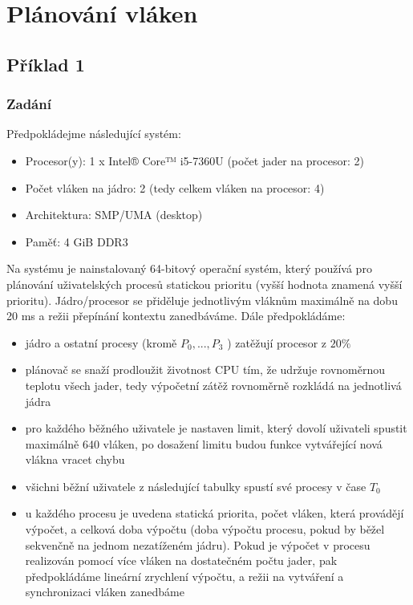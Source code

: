 \section{Plánování vláken}

\subsection{Příklad 1}
\subsubsection{Zadání}

Předpokládejme následující systém:
\begin{itemize}
    \item Procesor(y): 1 x Intel® Core™ i5-7360U (počet jader na procesor: 2)
    \item Počet vláken na jádro: 2 (tedy celkem vláken na procesor: 4)
    \item Architektura: SMP/UMA (desktop)
    \item Paměť: 4 GiB DDR3
\end{itemize}

Na systému je nainstalovaný 64-bitový operační systém, který používá pro plánování uživatelských procesů statickou prioritu (vyšší hodnota znamená vyšší prioritu). Jádro/procesor se přiděluje jednotlivým vláknům maximálně na dobu 20 ms a režii přepínání kontextu zanedbáváme. Dále předpokládáme:

\begin{itemize}
    \item jádro a ostatní procesy (kromě $P_0, ..., P_3$ ) zatěžují procesor z $20\%$
    \item plánovač se snaží prodloužit životnost CPU tím, že udržuje rovnoměrnou teplotu všech jader, tedy výpočetní zátěž rovnoměrně rozkládá na jednotlivá jádra
    \item pro každého běžného uživatele je nastaven limit, který dovolí uživateli spustit maximálně 640 vláken, po dosažení limitu budou funkce vytvářející nová vlákna vracet chybu
    \item všichni běžní uživatele z následující tabulky spustí své procesy v čase $T_0$
    \item u každého procesu je uvedena statická priorita, počet vláken, která provádějí výpočet, a celková doba výpočtu (doba výpočtu procesu, pokud by běžel sekvenčně na jednom nezatíženém jádru). Pokud je výpočet v procesu realizován pomocí více vláken na dostatečném počtu jader, pak předpokládáme lineární zrychlení výpočtu, a režii na vytváření a synchronizaci vláken zanedbáme
\end{itemize}

